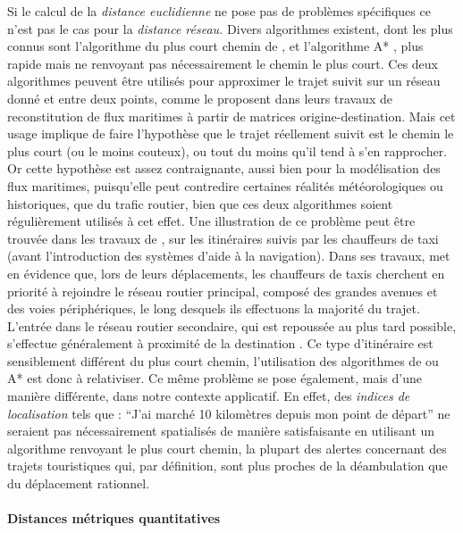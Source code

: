Si le calcul de la \emph{distance euclidienne} ne pose pas de
problèmes spécifiques ce n'est pas le cas pour la \emph{distance
  réseau.}  Divers algorithmes existent, dont les plus connus sont
l'algorithme du plus court chemin de \textcite{Dijkstra1959}, et
l'algorithme A* \autocite{Hart1968}, plus rapide mais ne renvoyant pas
nécessairement le chemin le plus court. Ces deux algorithmes peuvent
être utilisés pour approximer le trajet suivit sur un réseau donné et
entre deux points, comme le proposent \textcite{Berli2018, Bunel2018}
dans leurs travaux de reconstitution de flux maritimes à partir de
matrices origine-destination. Mais cet usage implique de faire
l'hypothèse que le trajet réellement suivit est le chemin le plus
court (ou le moins couteux), ou tout du moins qu'il tend à s'en
rapprocher. Or cette hypothèse est assez contraignante, aussi bien
pour la modélisation des flux maritimes, puisqu'elle peut contredire
certaines réalités météorologiques ou historiques, que du trafic
routier, bien que ces deux algorithmes soient régulièrement utilisés à
cet effet. Une illustration de ce problème peut être trouvée dans les
travaux de \textcite{Pailhous1970}, sur les itinéraires suivis par les
chauffeurs de taxi (avant l'introduction des systèmes d'aide à la
navigation). Dans ses travaux, \textcite{Pailhous1970} met en évidence
que, lors de leurs déplacements, les chauffeurs de taxis cherchent en
priorité à rejoindre le réseau routier principal, composé des grandes
avenues et des voies périphériques, le long desquels ils effectuons la
majorité du trajet. L'entrée dans le réseau routier secondaire, qui
est repoussée au plus tard possible, s'effectue généralement à
proximité de la destination \autocite{Lagesse2016}. Ce type
d'itinéraire est sensiblement différent du plus court chemin,
l'utilisation des algorithmes de \textcite{Dijkstra1959} ou A*
\autocite{Hart1968} est donc à relativiser. Ce même problème se pose
également, mais d'une manière différente, dans notre contexte
applicatif. En effet, des \emph{indices de localisation} tels que :
\enquote{J'ai marché 10 kilomètres depuis mon point de départ} ne
seraient pas nécessairement spatialisés de manière satisfaisante en
utilisant un algorithme renvoyant le plus court chemin, la plupart des
alertes concernant des trajets touristiques qui, par définition, sont
plus proches de la déambulation que du déplacement rationnel.

\paragraph{Distances métriques quantitatives}

